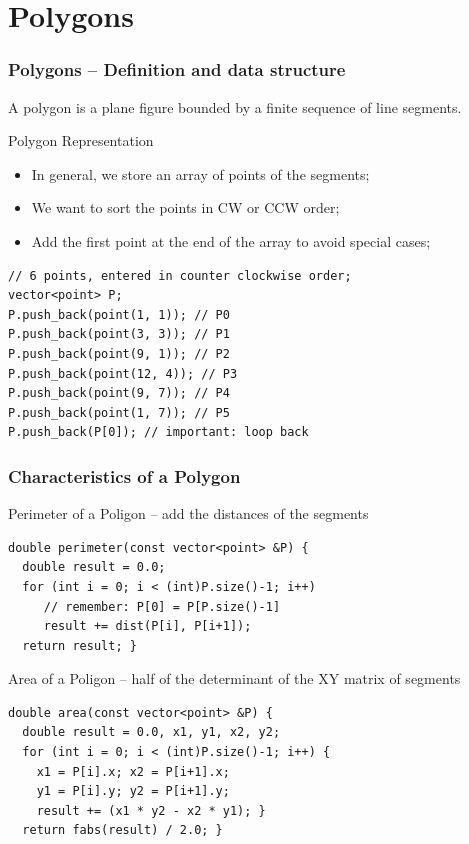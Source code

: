 \section{Polygons}
\begin{frame}[fragile]
  \frametitle{Polygons -- Definition and data structure}

    A polygon is a plane figure bounded by a finite sequence of line
    segments.

  \begin{exampleblock}{Polygon Representation}
    \begin{itemize}
    \item In general, we store an array of points of the segments;
    \item We want to sort the points in CW or CCW order;
    \item Add the first point at the end of the array to avoid
      special cases;
    \end{itemize}
{\smaller
\begin{verbatim}
// 6 points, entered in counter clockwise order;
vector<point> P;
P.push_back(point(1, 1)); // P0
P.push_back(point(3, 3)); // P1
P.push_back(point(9, 1)); // P2
P.push_back(point(12, 4)); // P3
P.push_back(point(9, 7)); // P4
P.push_back(point(1, 7)); // P5
P.push_back(P[0]); // important: loop back
\end{verbatim}}
\end{exampleblock}
\end{frame}

\begin{frame}[fragile]
  \frametitle{Characteristics of a Polygon}
  {\smaller
    \begin{exampleblock}{Perimeter of a Poligon -- add the distances of the segments}
\begin{verbatim}
double perimeter(const vector<point> &P) {
  double result = 0.0;
  for (int i = 0; i < (int)P.size()-1; i++)
     // remember: P[0] = P[P.size()-1]
     result += dist(P[i], P[i+1]);
  return result; }
\end{verbatim}
    \end{exampleblock}

    \begin{exampleblock}{Area of a Poligon -- half of the determinant of the XY matrix of segments}
\begin{verbatim}
double area(const vector<point> &P) {
  double result = 0.0, x1, y1, x2, y2;
  for (int i = 0; i < (int)P.size()-1; i++) {
    x1 = P[i].x; x2 = P[i+1].x;
    y1 = P[i].y; y2 = P[i+1].y;
    result += (x1 * y2 - x2 * y1); }
  return fabs(result) / 2.0; }
\end{verbatim}
    \end{exampleblock}
}
\end{frame}


